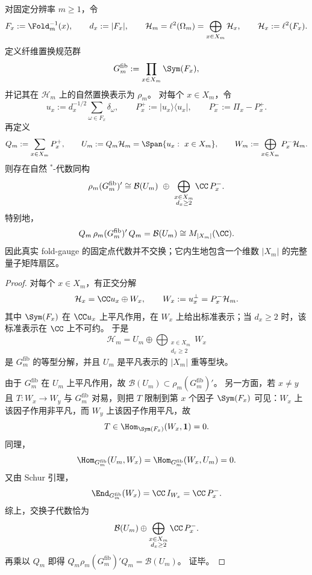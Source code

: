 \begin{theorem}\label{thm:conclusion-fold-gauge-commutant-matrix-sector}
对固定分辨率 \(m\ge 1\)，令
\[
F_x:=\Fold_m^{-1}(x),
\qquad
d_x:=|F_x|,
\qquad
\mathcal H_m=\ell^2(\Omega_m)=\bigoplus_{x\in X_m}\mathcal H_x,
\qquad
\mathcal H_x:=\ell^2(F_x).
\]
定义纤维置换规范群
\[
G_m^{\mathrm{fib}}:=\prod_{x\in X_m}\Sym(F_x),
\]
并记其在 \(\mathcal H_m\) 上的自然置换表示为 \(\rho_m\)。
对每个 \(x\in X_m\)，令
\[
u_x:=d_x^{-1/2}\sum_{\omega\in F_x}\delta_\omega,
\qquad
P_x^+:=\lvert u_x\rangle\langle u_x\rvert,
\qquad
P_x^-:=\Pi_x-P_x^+.
\]
再定义
\[
Q_m:=\sum_{x\in X_m}P_x^+,
\qquad
U_m:=Q_m\mathcal H_m=\Span\{u_x:\ x\in X_m\},
\qquad
W_m:=\bigoplus_{x\in X_m}P_x^-\mathcal H_m.
\]
则存在自然 \(^*\)-代数同构
\[
\rho_m(G_m^{\mathrm{fib}})'
\cong
\mathcal B(U_m)\ \oplus\ \bigoplus_{\substack{x\in X_m\\ d_x\ge 2}}\CC\,P_x^-.
\]
特别地，
\[
Q_m\,\rho_m(G_m^{\mathrm{fib}})'\,Q_m=\mathcal B(U_m)\cong M_{|X_m|}(\CC).
\]
因此真实 fold-gauge 的固定点代数并不交换；它内生地包含一个维数 \(|X_m|\) 的完整量子矩阵扇区。
\end{theorem}
\begin{proof}
对每个 \(x\in X_m\)，有正交分解
\[
\mathcal H_x=\CC u_x\oplus W_x,
\qquad
W_x:=u_x^\perp=P_x^-\mathcal H_m.
\]
其中 \(\Sym(F_x)\) 在 \(\CC u_x\) 上平凡作用，在 \(W_x\) 上给出标准表示；当 \(d_x\ge 2\) 时，该标准表示在 \(\CC\) 上不可约。
于是
\[
\mathcal H_m
=
U_m\oplus \bigoplus_{\substack{x\in X_m\\ d_x\ge 2}}W_x
\]
是 \(G_m^{\mathrm{fib}}\) 的等型分解，并且 \(U_m\) 是平凡表示的 \(|X_m|\) 重等型块。

由于 \(G_m^{\mathrm{fib}}\) 在 \(U_m\) 上平凡作用，故 \(\mathcal B(U_m)\subset \rho_m(G_m^{\mathrm{fib}})'\)。
另一方面，若 \(x\neq y\) 且 \(T:W_x\to W_y\) 与 \(G_m^{\mathrm{fib}}\) 对易，则把 \(T\) 限制到第 \(x\) 个因子 \(\Sym(F_x)\) 可见：\(W_x\) 上该因子作用非平凡，而 \(W_y\) 上该因子作用平凡，故
\[
T\in \Hom_{\Sym(F_x)}(W_x,\mathbf 1)=0.
\]
同理，
\[
\Hom_{G_m^{\mathrm{fib}}}(U_m,W_x)
=
\Hom_{G_m^{\mathrm{fib}}}(W_x,U_m)
=0.
\]
又由 Schur 引理，
\[
\End_{G_m^{\mathrm{fib}}}(W_x)=\CC\,I_{W_x}=\CC\,P_x^-.
\]
综上，交换子代数恰为
\[
\mathcal B(U_m)\oplus \bigoplus_{\substack{x\in X_m\\ d_x\ge 2}}\CC\,P_x^-.
\]
再乘以 \(Q_m\) 即得
\(
Q_m\rho_m(G_m^{\mathrm{fib}})'Q_m=\mathcal B(U_m)
\)。
证毕。
\end{proof}

